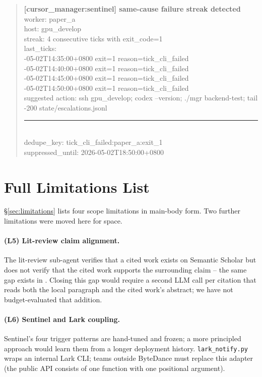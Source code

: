 \begin{quote}\small\ttfamily
\textbf{[cursor\_manager:sentinel] same-cause failure streak detected} \\
worker: paper\_a \\
host: gpu\_develop \\
streak: 4 consecutive ticks with exit\_code=1 \\
last\_ticks: \\
-05-02T14:35:00+0800  exit=1  reason=tick\_cli\_failed \\
-05-02T14:40:00+0800  exit=1  reason=tick\_cli\_failed \\
-05-02T14:45:00+0800  exit=1  reason=tick\_cli\_failed \\
-05-02T14:50:00+0800  exit=1  reason=tick\_cli\_failed \\
suggested action: ssh gpu\_develop; codex --version; ./mgr backend-test;
tail -200 state/escalations.jsonl \\
\rule{\linewidth}{0.4pt} \\
dedupe\_key: tick\_cli\_failed:paper\_a:exit\_1 \\
suppressed\_until: 2026-05-02T18:50:00+0800
\end{quote}

\section{Full Limitations List}
\label{app:limitations}

\S\ref{sec:limitations} lists four scope limitations in main-body
form. Two further limitations were moved here for space.

\paragraph{(L5) Lit-review claim alignment.} The lit-review
sub-agent verifies that a cited work exists on Semantic Scholar but
does not verify that the cited work supports the surrounding claim
-- the same gap exists in \citet{song2026paperorchestra}. Closing
this gap would require a second LLM call per citation that reads
both the local paragraph and the cited work's abstract; we have not
budget-evaluated that addition.

\paragraph{(L6) Sentinel and Lark coupling.} Sentinel's four
trigger patterns are hand-tuned and frozen; a more principled
approach would learn them from a longer deployment history.
\texttt{lark\_notify.py} wraps an internal Lark CLI; teams outside
ByteDance must replace this adapter (the public API consists of one
function with one positional argument).

